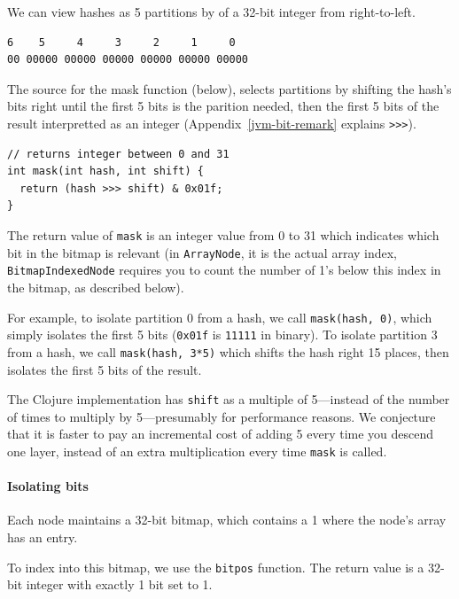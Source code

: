 \documentclass[preprint]{sigplanconf}
\begin{document}
We can view hashes as 5 partitions
by of a 32-bit integer from right-to-left.

\begin{verbatim}
6    5     4     3     2     1     0
00 00000 00000 00000 00000 00000 00000
\end{verbatim}

The source for the mask function (below),
selects partitions
by
shifting the hash's bits right until the first
5 bits is the parition needed, then the 
first 5 bits of the result
interpretted as an integer
(Appendix~\ref{jvm-bit-remark} explains \texttt{>>>}).


\begin{verbatim}
// returns integer between 0 and 31
int mask(int hash, int shift) {
  return (hash >>> shift) & 0x01f;
}
\end{verbatim}

The return value of \texttt{mask}
is an integer value from 0 to 31
which indicates which bit in the bitmap
is relevant (in \texttt{ArrayNode},
it is the actual array index,
\texttt{BitmapIndexedNode}
requires you to count the number of
1's below this index in the bitmap,
as described below).

For example,
to isolate partition 0 from a hash,
we call
\texttt{mask(hash, 0)},
which simply isolates the first 5 bits
(\texttt{0x01f} is
\texttt{11111} in binary).
To isolate partition 3 from a hash,
we call
\texttt{mask(hash, 3*5)} which shifts
the hash right 15 places, then isolates
the first 5 bits of the result.

The Clojure implementation has
\texttt{shift} as a multiple of 5---instead
of the number of times to multiply by 5---presumably 
for performance reasons.
We conjecture that it is faster
to pay an incremental cost of
adding 5 every time you descend one layer,
instead of an extra multiplication every
time \texttt{mask} is called.

\paragraph{Isolating bits}

Each node maintains a 32-bit bitmap, which
contains a 1 where the node's array has
an entry.

To index into this bitmap, we use
the \texttt{bitpos} function.
The return value is a 32-bit integer
with exactly 1 bit set to 1. 

%
\end{document}
